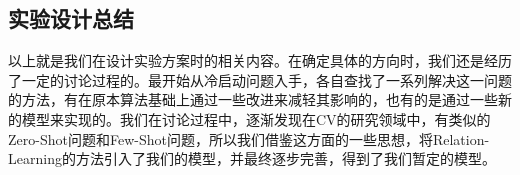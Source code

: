 \subsection{实验设计总结}
以上就是我们在设计实验方案时的相关内容。在确定具体的方向时，我们还是经历了一定的讨论过程的。最开始从冷启动问题入手，各自查找了一系列解决这一问题的方法，有在原本算法基础上通过一些改进来减轻其影响的，也有的是通过一些新的模型来实现的。我们在讨论过程中，逐渐发现在CV的研究领域中，有类似的Zero-Shot问题和Few-Shot问题，所以我们借鉴这方面的一些思想，将Relation-Learning的方法引入了我们的模型，并最终逐步完善，得到了我们暂定的模型。
